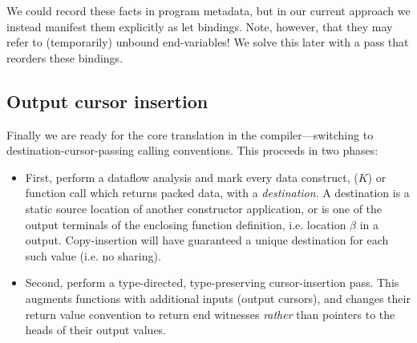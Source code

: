 \documentclass[a4paper,english]{lipics-v2016}
\newcommand{\fresh}[1]{\ensuremath{#1}}
\newcommand{\freshB}{\fresh{\beta}}
\begin{document}
We could record these facts in program metadata, but in our current approach we
instead manifest them explicitly as let bindings.  Note, however, that they may
refer to (temporarily) unbound end-variables!  We solve this later with a pass
that reorders these bindings.
%
%
%


\subsection{Output cursor insertion}\label{sec:cursorize}

Finally we are ready for the core translation in the compiler---switching to
destination-cursor-passing calling conventions.  This proceeds in two phases:

\begin{itemize}
\item First, perform a dataflow analysis and mark every data construct, ($K$)
      or function call which returns packed data, with a {\em destination}.  A
      destination is a static source location of another constructor
      application, or is one of the output terminals of the enclosing function
      definition, i.e. location \freshB{} in a \il{Tree$_\freshB$} output.
      Copy-insertion will have guaranteed a unique destination for each such
      value (i.e. no sharing).
\item Second, perform a type-directed, type-preserving cursor-insertion pass.
  This augments functions with additional inputs (output cursors), and changes
  their return value convention to return end witnesses {\em rather} than
  pointers to the heads of their output values.
\end{itemize}
\end{document}
